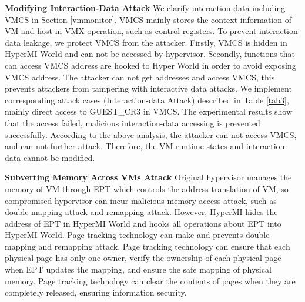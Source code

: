 \documentclass[conference]{IEEEtran}
\begin{document}
\textbf{Modifying Interaction-Data Attack}
We clarify interaction data including VMCS in Section \ref{vmmonitor}. VMCS mainly stores the context information of VM and host in VMX operation, such as control registers. To prevent interaction-data leakage, we protect VMCS from the attacker. Firstly, VMCS is hidden in HyperMI World and can not be accessed by hypervisor. Secondly, functions that can access VMCS address are hooked to Hyper World in order to avoid exposing VMCS address. The attacker can not get addresses and access VMCS, this prevents attackers from tampering with interactive data attacks. We implement corresponding attack cases (Interaction-data Attack) described in Table \ref{tab3}, mainly direct access to GUEST\_CR3 in VMCS. The experimental results show that the access failed, malicious interaction-data accessing is prevented successfully. According to the above analysis, the attacker can not access VMCS, and can not further attack. Therefore, the VM runtime states and interaction-data cannot be modified. 






\textbf{Subverting Memory Across VMs Attack}
Original hypervisor manages the memory of VM through EPT which controls the address translation of VM, so compromised hypervisor can incur malicious memory access attack, such as double mapping attack and remapping attack. However, HyperMI hides the address of EPT in HyperMI World and hooks all operations about EPT into HyperMI World. Page tracking technology can make and prevents double mapping and remapping attack. Page tracking technology can ensure that each physical page has only one owner, verify the ownership of each physical page when EPT updates the mapping, and ensure the safe mapping of physical memory. Page tracking  technology can clear the contents of pages when they are completely released, ensuring information security.
%
\end{document}
